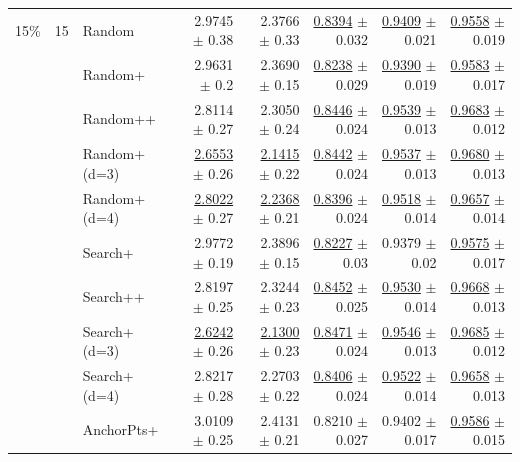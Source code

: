 \begin{longtable}{llp{}rrrrr}
\midrule
15\% & 15 & Random & 2.9745 {\scriptsize $\pm$ 0.38} & 2.3766 {\scriptsize $\pm$ 0.33} & \underline{0.8394} {\scriptsize $\pm$ 0.032} & \underline{0.9409} {\scriptsize $\pm$ 0.021} & \underline{0.9558} {\scriptsize $\pm$ 0.019} \\
 &  & Random+ & 2.9631 {\scriptsize $\pm$ 0.2} & 2.3690 {\scriptsize $\pm$ 0.15} & \underline{0.8238} {\scriptsize $\pm$ 0.029} & \underline{0.9390} {\scriptsize $\pm$ 0.019} & \underline{0.9583} {\scriptsize $\pm$ 0.017} \\
 &  & Random++ & 2.8114 {\scriptsize $\pm$ 0.27} & 2.3050 {\scriptsize $\pm$ 0.24} & \underline{0.8446} {\scriptsize $\pm$ 0.024} & \underline{0.9539} {\scriptsize $\pm$ 0.013} & \underline{0.9683} {\scriptsize $\pm$ 0.012} \\
 &  & Random+ (d=3) & \underline{2.6553} {\scriptsize $\pm$ 0.26} & \underline{2.1415} {\scriptsize $\pm$ 0.22} & \underline{0.8442} {\scriptsize $\pm$ 0.024} & \underline{0.9537} {\scriptsize $\pm$ 0.013} & \underline{0.9680} {\scriptsize $\pm$ 0.013} \\
 &  & Random+ (d=4) & \underline{2.8022} {\scriptsize $\pm$ 0.27} & \underline{2.2368} {\scriptsize $\pm$ 0.21} & \underline{0.8396} {\scriptsize $\pm$ 0.024} & \underline{0.9518} {\scriptsize $\pm$ 0.014} & \underline{0.9657} {\scriptsize $\pm$ 0.014} \\
 &  & Search+ & 2.9772 {\scriptsize $\pm$ 0.19} & 2.3896 {\scriptsize $\pm$ 0.15} & \underline{0.8227} {\scriptsize $\pm$ 0.03} & 0.9379 {\scriptsize $\pm$ 0.02} & \underline{0.9575} {\scriptsize $\pm$ 0.017} \\
 &  & Search++ & 2.8197 {\scriptsize $\pm$ 0.25} & 2.3244 {\scriptsize $\pm$ 0.23} & \underline{0.8452} {\scriptsize $\pm$ 0.025} & \underline{0.9530} {\scriptsize $\pm$ 0.014} & \underline{0.9668} {\scriptsize $\pm$ 0.013} \\
 &  & Search+ (d=3) & \underline{2.6242} {\scriptsize $\pm$ 0.26} & \underline{2.1300} {\scriptsize $\pm$ 0.23} & \underline{0.8471} {\scriptsize $\pm$ 0.024} & \underline{0.9546} {\scriptsize $\pm$ 0.013} & \underline{0.9685} {\scriptsize $\pm$ 0.012} \\
 &  & Search+ (d=4) & 2.8217 {\scriptsize $\pm$ 0.28} & 2.2703 {\scriptsize $\pm$ 0.22} & \underline{0.8406} {\scriptsize $\pm$ 0.024} & \underline{0.9522} {\scriptsize $\pm$ 0.014} & \underline{0.9658} {\scriptsize $\pm$ 0.013} \\
 &  & AnchorPts+ & 3.0109 {\scriptsize $\pm$ 0.25} & 2.4131 {\scriptsize $\pm$ 0.21} & 0.8210 {\scriptsize $\pm$ 0.027} & 0.9402 {\scriptsize $\pm$ 0.017} & \underline{0.9586} {\scriptsize $\pm$ 0.015} \\

\end{longtable}
